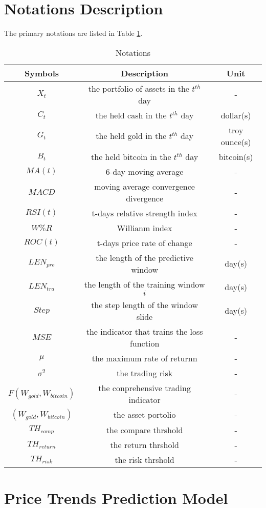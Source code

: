 \documentclass[12pt]{article}
\begin{document}
\section{Notations Description}
The primary notations are listed in Table \ref{T1}.
\begin{table}[h]
 \centering
 \caption{Notations} %
 \label{T1}
 \begin{tabular}{ccc}
  \toprule
  \textbf{Symbols} & \textbf{Description} & \textbf{Unit}\\
  \midrule
  $X_t$ & the portfolio of assets in the $t^{th}$ day & - \\
  $C_t$ & the held cash in the $t^{th}$ day & dollar(s) \\
  $G_t$ & the held gold in the $t^{th}$ day & troy ounce(s) \\
  $B_t$ & the held bitcoin in the $t^{th}$ day & bitcoin(s) \\
  $MA(t)$ & 6-day moving average & - \\
  $MACD$ & moving average convergence divergence & -\\
  $RSI(t)$ & t-days relative strength index & -\\
  $W\%R$ & Willianm index & -\\
  $ROC(t)$ & t-days price rate of change & -\\
  $LEN_{pre}$ & the length of the predictive window & day(s)\\
  $LEN_{tra}$ & the length of the training window $i$ & day(s)\\
  $Step$ & the  step length of the window slide & day(s)\\
  $MSE$ & the indicator that trains the loss function & -\\
  $\mu$ & the maximum rate of returnn & -\\
  $\sigma^2$ & the trading risk & -\\
  $F(W_{gold}, W_{bitcoin})$ & the conprehensive trading indicator & -\\
  $(W_{gold}, W_{bitcoin})$ & the asset portolio & -\\
  $TH_{comp}$ & the compare thrshold & -\\ 
  $TH_{return}$ & the return thrshold & -\\
  $TH_{risk}$ & the risk thrshold & -\\
  \bottomrule
 \end{tabular}
\end{table}

\section{Price Trends Prediction Model}
\end{document}
